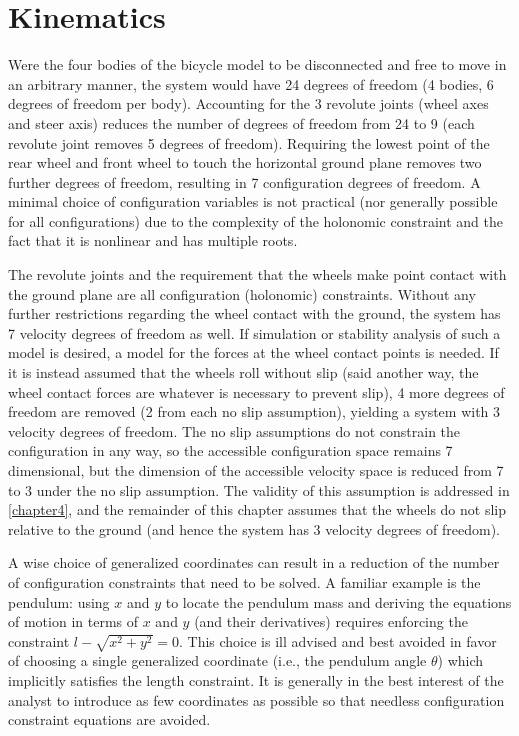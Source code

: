 \section{Kinematics} \label{model:kinematics}

Were the four bodies of the bicycle model to be disconnected and free to move
in an arbitrary manner, the system would have 24 degrees of freedom (4 bodies,
6 degrees of freedom per body). Accounting for the 3 revolute joints (wheel
axes and steer axis) reduces the number of degrees of freedom from 24 to 9
(each revolute joint removes 5 degrees of freedom). Requiring the lowest point
of the rear wheel and front wheel to touch the horizontal ground plane removes
two further degrees of freedom, resulting in 7 configuration degrees of
freedom. A minimal choice of configuration variables is not practical (nor
generally possible for all configurations) due to the complexity of the
holonomic constraint\cite{Peterson2008a} and the fact that it is nonlinear and
has multiple roots.

The revolute joints and the requirement that the wheels make point contact with
the ground plane are all configuration (holonomic) constraints. Without any
further restrictions regarding the wheel contact with the ground, the system
has 7 velocity degrees of freedom as well. If simulation or stability analysis
of such a model is desired, a model for the forces at the wheel contact points
is needed. If it is instead assumed that the wheels roll without slip (said
another way, the wheel contact forces are whatever is necessary to prevent
slip), 4 more degrees of freedom are removed (2 from each no slip assumption),
yielding a system with 3 velocity degrees of freedom. The no slip assumptions
do not constrain the configuration in any way, so the accessible configuration
space remains 7 dimensional, but the dimension of the accessible velocity space
is reduced from 7 to 3 under the no slip assumption.  The validity of this
assumption is addressed in \autoref{chapter4}, and the remainder of this
chapter assumes that the wheels do not slip relative to the ground (and hence
the system has 3 velocity degrees of freedom).

A wise choice of generalized coordinates can result in a reduction of the
number of configuration constraints that need to be solved. A familiar example
is the pendulum: using $x$ and $y$ to locate the pendulum mass and deriving the
equations of motion in terms of $x$ and $y$ (and their derivatives) requires
enforcing the constraint $l - \sqrt{x^2 + y^2} = 0$. This choice is ill advised
and best avoided in favor of choosing a single generalized coordinate (i.e.,
the pendulum angle $\theta$) which implicitly satisfies the length constraint.
It is generally in the best interest of the analyst to introduce as few
coordinates as possible so that needless configuration constraint equations are
avoided.

